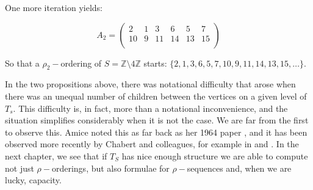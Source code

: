 \begin{example}
One more iteration yields:

\[A_2=
 \begin{pmatrix}
2 & 1 & 3 & 6 & 5 & 7 \\
10 & 9 & 11 & 14 & 13 & 15   \\
\end{pmatrix}
\]

So that a $\rho_2-$ordering of $S=\mathbb{Z} \setminus 4\mathbb{Z}$ starts: $\{2,1,3,6,5,7,10,9,11,14,13,15,\ldots\}$.

\end{example}


In the two propositions above, there was notational difficulty that arose when there was an unequal number of children between the vertices on a given level of $T_s$. This difficulty is, in fact, more than a notational inconvenience, and the situation simplifies considerably when it is not the case. We are far from the first to observe this. Amice noted this as far back as her 1964 paper \cite{amice}, and it has been observed more recently by Chabert and colleagues, for example in \cite{fp} and \cite{cef}. In the next chapter, we see that if $T_S$ has nice enough structure we are able to compute not just $\rho-$orderings, but also formulae for $\rho-$sequences and, when we are lucky, capacity.